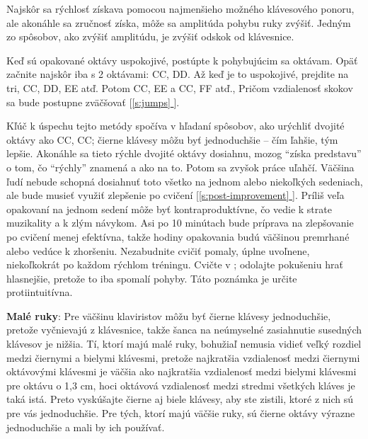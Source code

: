 \documentclass[11pt,a4paper]{book}
\newcommand{\musicfont}[1]{\raisebox{0.2em}{\fontspec[Scale=2.5,Path=fonts/]{Musica.ttf}{#1}}}
\newcommand*{\fullref}[1]{\hyperref[{#1}]{\ref*{#1} \nameref*{#1}}} %
\newcommand*{\fullrefp}[1]{[\fullref{#1}]} %
\begin{document}
Najskôr sa rýchlosť získava pomocou najmenšieho možného klávesového ponoru, ale akonáhle sa zručnosť získa, môže sa amplitúda pohybu ruky zvýšiť. Jedným zo spôsobov, ako zvýšiť amplitúdu, je zvýšiť odskok od klávesnice.

Keď sú opakované oktávy uspokojivé, postúpte k pohybujúcim sa oktávam. Opäť začnite najskôr iba s 2 oktávami: CC, DD. Až keď je to uspokojivé, prejdite na tri, CC, DD, EE atď. Potom CC, EE a CC, FF atď., Pričom vzdialenosť skokov sa bude postupne zväčšovať \fullrefp{s:jumps}.

Kľúč k úspechu tejto metódy spočíva v hľadaní spôsobov, ako urýchliť dvojité oktávy ako CC, CC; čierne klávesy môžu byť jednoduchšie – čím ľahšie, tým lepšie. Akonáhle sa tieto rýchle dvojité oktávy dosiahnu, mozog “získa predstavu” o tom, čo “rýchly” znamená a ako na to. Potom sa zvyšok práce uľahčí. Väčšina ľudí nebude schopná dosiahnuť toto všetko na jednom alebo niekoľkých sedeniach, ale bude musieť využiť zlepšenie po cvičení \fullrefp{s:post-improvement}. Príliš veľa opakovaní na jednom sedení môže byť kontraproduktívne, čo vedie k strate muzikality a k zlým návykom. Asi po 10 minútach bude príprava na zlepšovanie po cvičení menej efektívna, takže hodiny opakovania budú väčšinou premrhané alebo vedúce k zhoršeniu. Nezabudnite cvičiť pomaly, úplne uvoľnene, niekoľkokrát po každom rýchlom tréningu. Cvičte v \musicfont{𝆏}; odolajte pokušeniu hrať hlasnejšie, pretože to iba spomalí pohyby. Táto poznámka je určite protiintuitívna.

\textbf{Malé ruky}: Pre väčšinu klaviristov môžu byť čierne klávesy jednoduchšie, pretože vyčnievajú z klávesnice, takže šanca na neúmyselné zasiahnutie susedných klávesov je nižšia. Tí, ktorí majú malé ruky, bohužiaľ nemusia vidieť veľký rozdiel medzi čiernymi a bielymi klávesmi, pretože najkratšia vzdialenosť medzi čiernymi oktávovými klávesmi je väčšia ako najkratšia vzdialenosť medzi bielymi klávesmi pre oktávu o 1,3 cm, hoci oktávová vzdialenosť medzi stredmi všetkých kláves je taká istá. Preto vyskúšajte čierne aj biele klávesy, aby ste zistili, ktoré z nich sú pre vás jednoduchšie. Pre tých, ktorí majú väčšie ruky, sú čierne oktávy výrazne jednoduchšie a mali by ich používať. 
\end{document}
